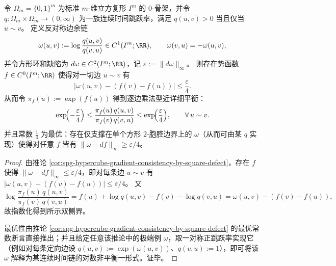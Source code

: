 \begin{theorem}\label{thm:spg-hypercube-near-detailed-balance-optimal}
令 \(\Omega_m=\{0,1\}^m\) 为标准 \(m\)-维立方复形 \(I^m\) 的 \(0\)-骨架，并令 \(q:\Omega_m\times\Omega_m\to(0,\infty)\) 为一族连续时间跳跃率，满足 \(q(u,v)>0\) 当且仅当 \(u\sim v\)。
定义反对称边余链
\[
\omega(u,v):=\log\frac{q(u,v)}{q(v,u)}\in C^1(I^m;\RR),
\qquad \omega(v,u)=-\omega(u,v),
\]
并令方形环和缺陷为 \(d\omega\in C^2(I^m;\RR)\)，记
\(
\varepsilon:=\|d\omega\|_\infty
\)。
则存在势函数 \(f\in C^0(I^m;\RR)\) 使得对一切边 \(u\sim v\) 有
\[
\bigl|\omega(u,v)-(f(v)-f(u))\bigr|\le \frac{\varepsilon}{4}.
\]
从而令 \(\pi_f(u):=\exp(f(u))\) 得到逐边乘法型近详细平衡：
\[
\exp\!\Bigl(-\frac{\varepsilon}{4}\Bigr)
\le
\frac{\pi_f(u)\,q(u,v)}{\pi_f(v)\,q(v,u)}
\le
\exp\!\Bigl(\frac{\varepsilon}{4}\Bigr),
\qquad \forall\,u\sim v.
\]
并且常数 \(\frac14\) 为最优：存在仅支撑在单个方形 \(2\)-胞腔边界上的 \(\omega\)（从而可由某 \(q\) 实现）使得对任意 \(f\) 皆有
\(
\|\omega-df\|_\infty\ge \varepsilon/4
\)。
\end{theorem}
\begin{proof}
由推论 \ref{cor:spg-hypercube-gradient-consistency-by-square-defect}，存在 \(f\) 使得 \(\|\omega-df\|_\infty\le \varepsilon/4\)，即对每条边 \(u\sim v\) 有
\(
|\omega(u,v)-(f(v)-f(u))|\le \varepsilon/4
\)。
又
\[
\log\frac{\pi_f(u)\,q(u,v)}{\pi_f(v)\,q(v,u)}
=
f(u)+\log q(u,v)-f(v)-\log q(v,u)
=
\omega(u,v)-(f(v)-f(u)),
\]
故指数化得到所示双侧界。
\par
最优性由推论 \ref{cor:spg-hypercube-gradient-consistency-by-square-defect} 的最优常数断言直接推出；并且给定任意该推论中的极端例 \(\omega\)，取一对称正跳跃率实现它（例如对每条定向边设 \(q(u,v):=\exp(\omega(u,v))\)、\(q(v,u):=1\)），即可将该 \(\omega\) 解释为某连续时间链的对数非平衡一形式。证毕。
\end{proof}

\endinput

